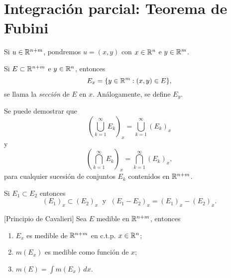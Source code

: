                             \section{Integraci\'on parcial: Teorema de Fubini}
                            
        Si $u \in \mathbb{R}^{n+m}$, pondremos $u=(x,y)$
        con $x \in \mathbb{R}^n$ e $y \in \mathbb{R}^m$. 
        
        Si $E\subset \mathbb{R}^{n+m}$ e $y\in \mathbb{R}^n$, entonces
        \[
        E_x=\{y \in \mathbb{R}^m: (x,y)\in E\},
        \]
        se llama la \emph{secci\'on} de $E$ en $x$.
                An\'alogamente, se define $E_y$.
        
        Se puede demostrar que 
        \[
        \left(\bigcup\limits_{k=1}^{\infty} E_k \right)_x
        = \bigcup\limits_{k=1}^{\infty} \left(E_k\right)_x\]
        y
        \[
        \left(\bigcap\limits_{k=1}^{\infty} E_k \right)_x
        = \bigcap\limits_{k=1}^{\infty} \left(E_k\right)_x,\]
        para cualquier sucesi\'on de conjuntos $E_k$ contenidos en $\mathbb{R}^{n+m}$. 
        
        Si $E_1\subset E_2$ entonces 
        \[
        \left(E_1\right)_x  \subset   \left(E_2\right)_x   
       \; \mbox{ y }\;
        \left(E_1-E_2\right)_x=\left(E_1\right)_x -\left(E_2\right)_x.
        \]
        
        \begin{teorema}{}[Principio de Cavalieri]
        Sea $E$ medible en $\mathbb{R}^{n+m}$, entonces
        \begin{enumerate}
            \item $E_x$ es medible de $\mathbb{R}^{n+m}$ en c.t.p. $x \in \mathbb{R}^n$;
            \item $m\left(E_x\right)$ es medible como funci\'on de $x$;
            \item $m(E)=\int m\left(E_x\right)\, dx$.
        \end{enumerate}
        \end{teorema}
        
